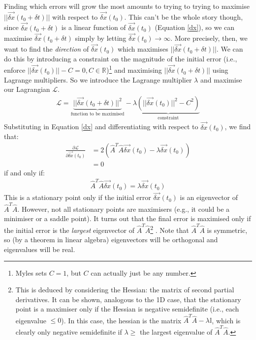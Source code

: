Finding which errors will grow the most amounts to trying to trying to maximise $||\vec{\delta x}(t_0+\delta t)||$ with respect to $\vec{\delta x}(t_0)$. This can't be the whole story though, since $\vec{\delta x}(t_0+\delta t)$ is a linear function of $\vec{\delta x}(t_0)$ (Equation \ref{dx}), so we can maximise $\vec{\delta x}(t_0+\delta t)$ simply by letting $\vec{\delta x}(t_0)\to\infty$. More precisely, then, we want to find the \textit{direction} of $\vec{\delta x}(t_0)$ which maximises $||\vec{\delta x}(t_0+\delta t)||$. We can do this by introducing a constraint on the magnitude of the initial error (i.e., enforce $||\vec{\delta x}(t_0)||-C=0,C\in\mathbb{R}$)\footnote{Myles sets $C=1$, but $C$ can actually just be any number.} and maximising $||\vec{\delta x}(t_0+\delta t)||$ using Lagrange multipliers. So we introduce the Lagrange multiplier $\lambda$ and maximise our Lagrangian $\mathscr{L}$.
\begin{align}
    \mathscr{L}=\underbrace{||\vec{\delta x}(t_0+\delta t)||^2}_{\text{function to be maximised}}-\lambda\underbrace{(||\vec{\delta x}(t_0)||^2-C^2)}_\text{constraint}
\end{align}
Substituting in Equation \ref{dx} and differentiating with respect to $\vec{\delta x}(t_0)$, we find that:
\begin{align*}
    \frac{\partial\mathscr{L}}{\partial\vec{\delta x
    }(t_0)}&=2(\hat{A}^T\hat{A}\vec{\delta x}(t_0)-\lambda\vec{\delta x}(t_0))\\
    &=0
\end{align*}
if and only if:
\begin{align*}
    \hat{A}^T\hat{A}\vec{\delta x}(t_0)=\lambda\vec{\delta x}(t_0)
\end{align*}
This is a stationary point only if the initial error $\vec{\delta x}(t_0)$ is an eigenvector of $\hat{A}^T\hat{A}$. However, not all stationary points are maximisers (e.g., it could be a minimiser or a saddle point). It turns out that the final error is maximised only if the initial error is the \textit{largest} eigenvector of $\hat{A}^T\hat{A}$\footnote{
    This is deduced by considering the Hessian: the matrix of second partial derivatives. It can be shown, analogous to the 1D case, that the stationary point is a maximiser only if the Hessian is negative semidefinite (i.e., each eigenvalue $\leq0$). In this case, the hessian is the matrix $\hat{A}^T\hat{A}-\lambda\mathbb{I}$, which is clearly only negative semidefinite if $\lambda\geq$ the largest eigenvalue of $\hat{A}^T\hat{A}$.}
. Note that $\hat{A}^T\hat{A}$ is symmetric, so (by a theorem in linear algebra) eigenvectors will be orthogonal and eigenvalues will be real.

